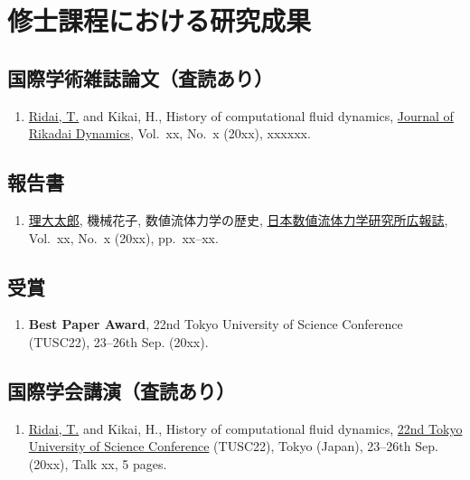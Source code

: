\appendix
\label{ch:app}
\pagestyle{appendix}

\chapter{修士課程における研究成果}
\label{ch:app_master}

\section*{国際学術雑誌論文（査読あり）}
\label{sec:app_journal}
\begin{enumerate}
    \item \underline{Ridai, T.} and Kikai, H., History of computational fluid dynamics, \href{https://doi.org/xxxxxx}{Journal of Rikadai Dynamics}, Vol.~xx, No.~x (20xx), xxxxxx.
\end{enumerate}

\section*{報告書}
\label{sec:app_report}
\begin{enumerate}
    \item \underline{理大太郎}, 機械花子, 数値流体力学の歴史, \href{https://xxxxxx}{日本数値流体力学研究所広報誌}, Vol.~xx, No.~x (20xx), pp.~xx--xx.
\end{enumerate}

\section*{受賞}
\label{sec:app_award}
\begin{enumerate}
    \item \textbf{Best Paper Award}, 22nd Tokyo University of Science Conference (TUSC22), 23--26th Sep. (20xx).
\end{enumerate}

\section*{国際学会講演（査読あり）}
\label{sec:app_kokusai_review}
\begin{enumerate}
    \item \underline{Ridai, T.} and Kikai, H., History of computational fluid dynamics, \href{https://xxxxxx}{22nd Tokyo University of Science Conference} (TUSC22), Tokyo (Japan), 23--26th Sep. (20xx), Talk xx, 5 pages.
\end{enumerate}

